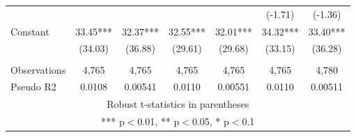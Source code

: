 \documentclass[]{article}
\begin{document}
\begin{tabular}{lcccccc}
 &  &  &  &  & (-1.71) & (-1.36) \\
Constant & 33.45*** & 32.37*** & 32.55*** & 32.01*** & 34.32*** & 33.40*** \\
 & (34.03) & (36.88) & (29.61) & (29.68) & (33.15) & (36.28) \\
 &  &  &  &  &  &  \\
Observations & 4,765 & 4,765 & 4,765 & 4,765 & 4,765 & 4,780 \\
 Pseudo R2 & 0.0108 & 0.00541 & 0.0110 & 0.00551 & 0.0110 & 0.00511 \\ \hline
\multicolumn{7}{c}{ Robust t-statistics in parentheses} \\
\multicolumn{7}{c}{ *** p$<$0.01, ** p$<$0.05, * p$<$0.1} \\
\end{tabular}
\end{document}

